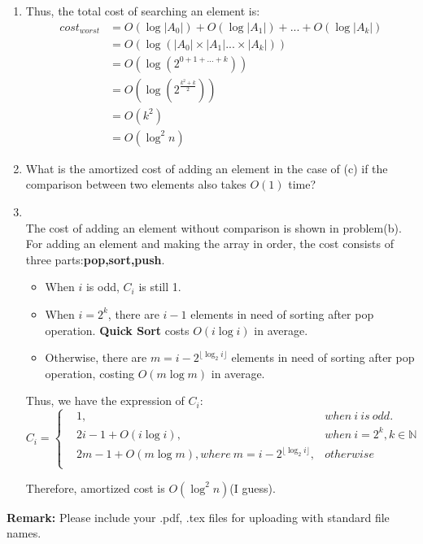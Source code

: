 \documentclass[12pt,a4paper]{article}
\makeatletter
\newtheorem*{solution}{Solution}
\theoremstyle{definition}
\renewenvironment{solution}[1][Solution] {\par\pushQED{\qed}\normalfont\topsep6\p@\@plus6\p@\relax\trivlist\item[\hskip\labelsep\bfseries#1\@addpunct{.}]\ignorespaces}{\popQED\endtrivlist\@endpefalse} \makeatother
\makeatother
\begin{document}
\begin{enumerate}
\begin{enumerate}
\begin{solution}
        Thus, the total cost of searching an element is:
        $$
        \begin{aligned}
        cost_{worst} &= O(\log|A_0|) + O(\log|A_1|)+...+O(\log|A_k|)\\
        &=O(\log(|A_0|\times|A_1|...\times |A_k|))\\
        &=O(\log(2^{0+1+...+k})) \\
        &=O(\log(2^{\frac{k^2+k}{2}}))\\
        &=O(k^2)\\
        &=O(\log^2n)
        \end{aligned}
        $$
        \end{solution}
\item What is the amortized cost of adding an element in the case of (c) if the comparison between two elements also takes $O(1)$ time?
\begin{solution}
~\\
The cost of adding an element without comparison is shown in problem(b). For adding an element and making the array in order, the cost consists of three parts:\textbf{pop,sort,push}.
\begin{itemize}
    \item When $i$ is odd, $C_i$ is still 1.
    \item When $i=2^k$, there are $i-1$ elements in need of sorting after pop operation. \textbf{Quick Sort} costs $O(i\log i)$ in average.
    \item Otherwise, there are $m=i-2 ^{\lfloor \log_2 i\rfloor}$ elements in need of sorting after pop operation, costing $O(m\log m)$ in average.
\end{itemize}
Thus, we have the expression of $C_i$:
$$
        C_i = \left\{
        \begin{aligned}
        &1, &when\ i\ is\ odd.\\
        &2i-1+O(i\log i), &when\ i=2^k,k\in \mathbb{N}\\
        &2m-1+O(m\log m) ,where\ m=i-2 ^{\lfloor \log_2 i\rfloor}, &otherwise\\
        \end{aligned}
        \right.
        $$

Therefore, amortized cost is $O(\log^2n)$(I guess).
\end{solution}
    \end{enumerate}
	
\end{enumerate}



\textbf{Remark:} Please include your .pdf, .tex files for uploading with standard file names.


\end{document}
